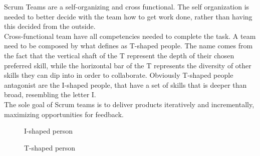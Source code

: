 \documentclass[../main.tex]{subfiles}
\begin{document}
Scrum Teams are a self-organizing and cross functional. The self organization is needed to better decide with the team how to get work done, rather than having this decided from the outside.\\
Cross-functional team have all competencies needed to complete the task. A team need to be composed by what \citeauthor{Scrumastery} defines as T-shaped people. The name comes from the fact that the vertical shaft of the T represent the depth of their chosen preferred skill, while the horizontal bar of the T represents the diversity of other skills they can dip into in order to collaborate. Obviously T-shaped people antagonist are the I-shaped people, that have a set of skills that is deeper than broad, resembling the letter I.\\
The sole goal of Scrum teams is to deliver products iteratively and incrementally, maximizing opportunities for feedback. 
\begin{figure}[H]
\centering
\begin{minipage}{.5\textwidth}
  \centering

  \caption{I-shaped person}
\end{minipage}%
\begin{minipage}{.5\textwidth}
  \centering
{} %
  \caption{T-shaped person}
\end{minipage}
\end{figure}
\end{document}
